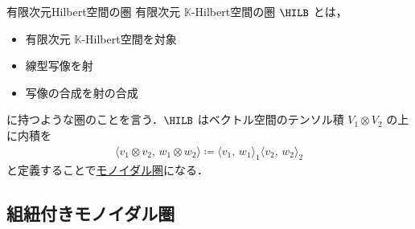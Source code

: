 \documentclass[TQFT_main]{subfiles}
\begin{document}
\begin{myexample}[label=Hilb]{有限次元Hilbert空間の圏}
    有限次元 $\mathbb{K}$-Hilbert空間の圏 $\HILB$ とは，
    \begin{itemize}
        \item 有限次元 $\mathbb{K}$-Hilbert空間を対象
        \item 線型写像を射
        \item 写像の合成を射の合成
    \end{itemize}
    に持つような圏のことを言う．$\HILB$ はベクトル空間のテンソル積 $V_1 \otimes V_2$ の上に内積を
    \begin{align}
        \langle v_1 \otimes v_2,\, w_1 \otimes w_2 \rangle \coloneqq \langle v_1,\, w_1 \rangle_1 \langle v_2,\, w_2 \rangle_2
    \end{align}
    と定義することで\hyperref[def:monoidal-category]{モノイダル圏}になる．
\end{myexample}

\subsection{組紐付きモノイダル圏}
\end{document}
